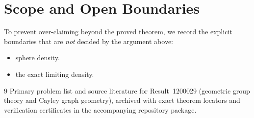 \documentclass[10pt,reqno]{amsart}
\theoremstyle{definition}
\begin{document}
\section{Scope and Open Boundaries}

To prevent over-claiming beyond the proved theorem, we record the explicit boundaries that are \emph{not} decided by the argument above:
\begin{itemize}
  \item sphere density.
  \item the exact limiting density.
\end{itemize}

\begin{thebibliography}{9}
Primary problem list and source literature for Result~1200029 (geometric group theory and Cayley graph geometry), archived with exact theorem locators and verification certificates in the accompanying repository package.
\end{thebibliography}
\end{document}
